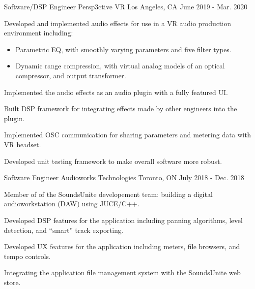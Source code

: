 \begin{cventries}
  \cventry
    {Software/DSP Engineer} %
    {Persp3ctive VR} %
    {Los Angeles, CA} %
    {June 2019 - Mar. 2020} %
    {
      \begin{cvitems} %
        \item {Developed and implemented audio effects for use in a VR audio production environment including:}
        \begin{itemize}
            \item {Parametric EQ, with smoothly varying parameters and five filter types.}
            \item {Dynamic range compression, with virtual analog models of
                   an optical compressor, and output transformer.}
        \end{itemize}
        \item {Implemented the audio effects as an audio plugin with a fully featured UI.}
        \item {Built DSP framework for integrating effects made by other engineers into the plugin.}
        \item {Implemented OSC communication for sharing parameters and metering data with VR headset.}
        \item {Developed unit testing framework to make overall software more robust.}
      \end{cvitems}
    }

  \cventry
    {Software Engineer} %
    {Audioworks Technologies} %
    {Toronto, ON} %
    {July 2018 - Dec. 2018} %
    {
      \begin{cvitems} %
        \item {Member of of the SoundsUnite developement team: building a digital audioworkstation (DAW) using JUCE/C++.}
        \item {Developed DSP features for the application including panning algorithms, level detection, and ``smart'' track exporting.}
        \item {Developed UX features for the application including meters, file browsers, and tempo controls.}
        \item {Integrating the application file management system with the SoundsUnite web store.}
      \end{cvitems}
    }


\end{cventries}
